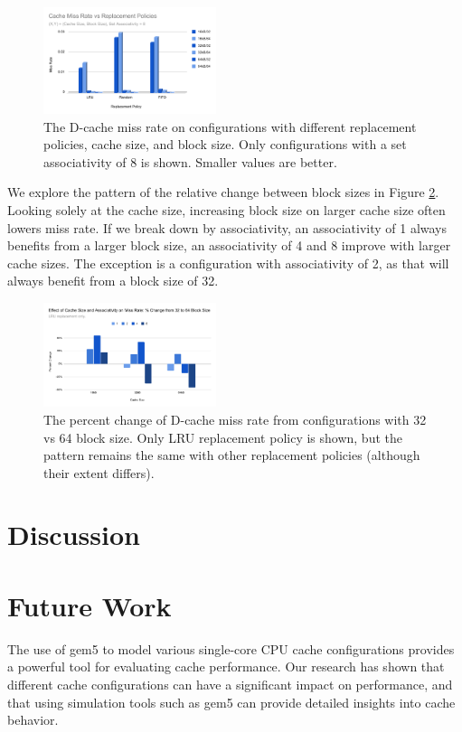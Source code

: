\documentclass[conference]{IEEEtran}
\begin{document}
\begin{figure}[H]
  \centering
  \includegraphics[width=0.45\textwidth]{images/missrate_replacement}
  \caption{The D-cache miss rate on configurations with different replacement policies, cache size, and block size. Only configurations with a set associativity of 8 is shown. Smaller values are better.}
  \label{fig:rijndael-missrate-replacement}
\end{figure}

We explore the pattern of the relative change between block sizes in Figure \ref{fig:rijndael-missrate-percentchange}. Looking solely at the cache size, increasing block size on larger cache size often lowers miss rate. If we break down by associativity, an associativity of 1 always benefits from a larger block size, an associativity of 4 and 8 improve with larger cache sizes. The exception is a configuration with associativity of 2, as that will always benefit from a block size of 32.

\begin{figure}[H]
  \centering
  \includegraphics[width=0.45\textwidth]{images/rijndael_missrate_percentchange}
  \caption{The percent change of D-cache miss rate from configurations with 32 vs 64 block size. Only LRU replacement policy is shown, but the pattern remains the same with other replacement policies (although their extent differs).}
  \label{fig:rijndael-missrate-percentchange}
\end{figure}

\section{Discussion}


\section{Future Work}
The use of gem5 to model various single-core CPU cache configurations provides a powerful tool for evaluating cache performance. Our research has shown that different cache configurations can have a significant impact on performance, and that using simulation tools such as gem5 can provide detailed insights into cache behavior.
\end{document}
